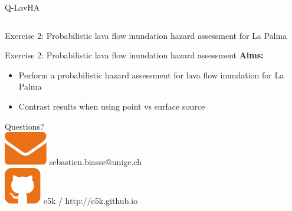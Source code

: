 \documentclass[10pt,aspectratio=169]{beamer}
\begin{document}
\begin{frame}{Q-LavHA}
\begin{columns}[T]
    \end{columns}
 \end{frame}



\begin{frame}[standout]
  \alert{Exercise 2:} Probabilistic lava flow inundation hazard assessment for La Palma
\end{frame}

\begin{frame}[t]{Exercise 2: Probabilistic lava flow inundation hazard assessment}
  \textbf{Aims:}
  \begin{itemize}
    \item Perform a probabilistic hazard assessment for lava flow inundation for La Palma
    \item Contrast results when using \alert{point} vs \alert{surface} source
  \end{itemize}
  

\end{frame}


\begin{frame}[standout]
  Questions?\vspace*{.3cm}\\
  \footnotesize \includegraphics[height=.2cm]{iconMail.pdf} \textmd{     sebastien.biasse@unige.ch}\\
  \footnotesize \includegraphics[height=.25cm]{iconGit.pdf} \textmd{     e5k / http://e5k.github.io }
\end{frame}
\end{document}
